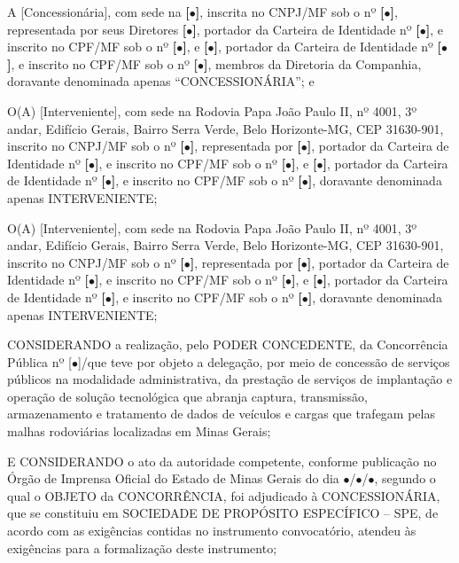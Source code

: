 \documentclass[a4paper,11pt]{report} %
\newcommand{\NumeroLicitacao}{[$\bullet$]}
\newcommand{\AnoLicitacao}{\the\year}
\newcommand{\DataHomologacao}{$\bullet$/$\bullet$/$\bullet$}
\newcommand{\ContratanteEndereco}{Rodovia Papa João Paulo II, nº 4001, 3º andar, Edifício Gerais, Bairro Serra Verde, Belo Horizonte-MG, CEP 31630-901}
\newcommand{\Contratada}{[Concessionária]}
\newcommand{\ContratadaEndereco}{\textbf{[$\bullet$]}}
\newcommand{\ContratadaCNPJ}{\textbf{[$\bullet$]}}
\newcommand{\RepresentanteContratadaNomeA}{\textbf{[$\bullet$]}} %
\newcommand{\RepresentanteContratadaCPFA}{\textbf{[$\bullet$]}}
\newcommand{\RepresentanteContratadaCIA}{\textbf{[$\bullet$]}}
\newcommand{\RepresentanteContratadaNomeB}{\textbf{[$\bullet$]}} %
\newcommand{\RepresentanteContratadaCPFB}{\textbf{[$\bullet$]}}
\newcommand{\RepresentanteContratadaCIB}{\textbf{[$\bullet$]}}
\newcommand{\IntervenienteANome}{[Interveniente]}
\newcommand{\IntervenienteAEndereco}{\ContratanteEndereco}
\newcommand{\IntervenienteACNPJ}{\textbf{[$\bullet$]}}
\newcommand{\RepresentanteAIntervenienteA}{\textbf{[$\bullet$]}} %
\newcommand{\RepresentanteAIntervenienteACI}{\textbf{[$\bullet$]}}
\newcommand{\RepresentanteAIntervenienteACPF}{\textbf{[$\bullet$]}}
\newcommand{\RepresentanteBIntervenienteACI}{\textbf{[$\bullet$]}}
\newcommand{\RepresentanteBIntervenienteACPF}{\textbf{[$\bullet$]}}
\newcommand{\IntervenienteBNome}{[Interveniente]}
\newcommand{\IntervenienteBEndereco}{\ContratanteEndereco}
\newcommand{\IntervenienteBCNPJ}{\textbf{[$\bullet$]}}
\newcommand{\RepresentanteAIntervenienteB}{\textbf{[$\bullet$]}} %
\newcommand{\RepresentanteAIntervenienteBCI}{\textbf{[$\bullet$]}}
\newcommand{\RepresentanteAIntervenienteBCPF}{\textbf{[$\bullet$]}}
\newcommand{\RepresentanteBIntervenienteBCI}{\textbf{[$\bullet$]}}
\newcommand{\RepresentanteBIntervenienteBCPF}{\textbf{[$\bullet$]}}
\begin{document}
A \Contratada, com sede na \ContratadaEndereco, inscrita no CNPJ/MF sob o nº \ContratadaCNPJ, representada por seus Diretores \RepresentanteContratadaNomeA, portador da Carteira de Identidade nº \RepresentanteContratadaCIA, e inscrito no CPF/MF sob o nº \RepresentanteContratadaCPFA, e \RepresentanteContratadaNomeB, portador da Carteira de Identidade nº \RepresentanteContratadaCIB, e inscrito no CPF/MF sob o nº \RepresentanteContratadaCPFB, membros da Diretoria da Companhia, doravante denominada apenas “CONCESSIONÁRIA”; e

O(A) \IntervenienteANome, com sede na \IntervenienteAEndereco, inscrito no CNPJ/MF sob o nº \IntervenienteACNPJ, representada por \RepresentanteAIntervenienteA, portador da Carteira de Identidade nº \RepresentanteAIntervenienteACI, e inscrito no CPF/MF sob o nº \RepresentanteAIntervenienteACPF, e \RepresentanteBIntervenienteACPF, portador da Carteira de Identidade nº \RepresentanteBIntervenienteACI, e inscrito no CPF/MF sob o nº \RepresentanteBIntervenienteACPF, doravante denominada apenas INTERVENIENTE;

O(A) \IntervenienteBNome, com sede na \IntervenienteBEndereco, inscrito no CNPJ/MF sob o nº \IntervenienteBCNPJ, representada por \RepresentanteAIntervenienteB, portador da Carteira de Identidade nº \RepresentanteAIntervenienteBCI, e inscrito no CPF/MF sob o nº \RepresentanteAIntervenienteBCPF, e \RepresentanteBIntervenienteBCPF, portador da Carteira de Identidade nº \RepresentanteBIntervenienteBCI, e inscrito no CPF/MF sob o nº \RepresentanteBIntervenienteBCPF, doravante denominada apenas INTERVENIENTE;

CONSIDERANDO a realização, pelo PODER CONCEDENTE, da Concorrência Pública nº \NumeroLicitacao/\AnoLicitacao que teve por objeto a delegação, por meio de concessão de serviços públicos na modalidade administrativa, da prestação de serviços de implantação e operação de solução tecnológica que abranja captura, transmissão, armazenamento e tratamento de dados de veículos e cargas que trafegam pelas malhas rodoviárias localizadas em Minas Gerais;

E CONSIDERANDO o ato da autoridade competente, conforme publicação no Órgão de Imprensa Oficial do Estado de Minas Gerais do dia \DataHomologacao, segundo o qual o OBJETO da CONCORRÊNCIA, foi adjudicado à CONCESSIONÁRIA, que se constituiu em SOCIEDADE DE PROPÓSITO ESPECÍFICO – SPE, de acordo com as exigências contidas no instrumento convocatório, atendeu às exigências para a formalização deste instrumento;
\end{document}
